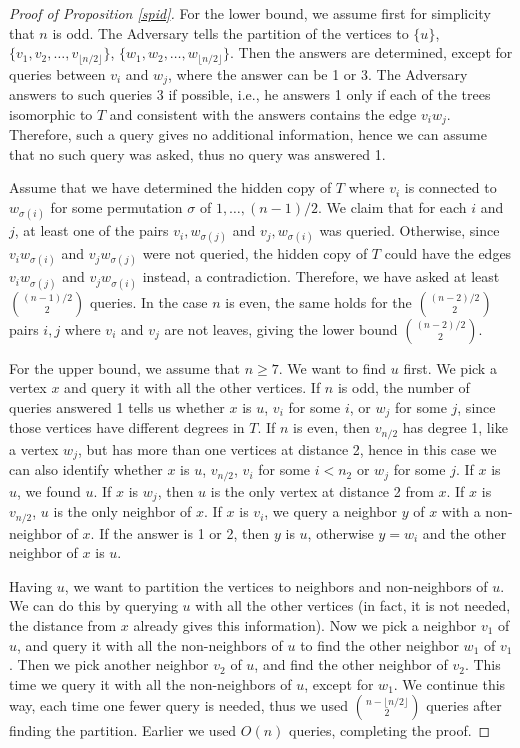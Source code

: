 \documentclass[12pt,a4paper]{amsart}
\theoremstyle{plain}
\theoremstyle{definition}
\begin{document}
\begin{proof}[Proof of Proposition \ref{spid}]
    For the lower bound, we assume first for simplicity that $n$ is odd. The Adversary tells the partition of the vertices to $\{u\}$, $\{v_1 , v_2,  \ldots , v_{\lfloor n/2 \rfloor}\}$, $\{w_1 , w_2, \ldots , w_{\lfloor n/2 \rfloor}\}$. Then the answers are determined, except for queries between $v_i$ and $w_j$, where the answer can be 1 or 3. The Adversary answers to such queries 3 if possible, i.e., he answers 1 only if each of the trees isomorphic to $T$ and consistent with the answers contains the edge $v_iw_j$. Therefore, such a query gives no additional information, hence we can assume that no such query was asked, thus no query was answered 1.


    Assume that we have determined the hidden copy of $T$ where $v_i$ is connected to $w_{\sigma(i)}$ for some permutation $\sigma$ of $1,\dots,(n-1)/2$. We claim that for each $i$ and $j$, at least one of the pairs $v_i,w_{\sigma(j)}$ and $v_j,w_{\sigma(i)}$ was queried. Otherwise, since $v_iw_{\sigma(i)}$ and $v_jw_{\sigma(j)}$ were not queried, the hidden copy of $T$ could have the edges $v_iw_{\sigma(j)}$ and $v_jw_{\sigma(i)}$ instead, a contradiction. Therefore, we have asked at least $\binom{(n-1)/2}{2}$ queries.
    In the case $n$ is even, the same holds for the $\binom{(n-2)/2}{2}$ pairs $i,j$ where $v_i$ and $v_j$ are not leaves, giving the lower bound $\binom{(n-2)/2}{2}$. 

 

 \smallskip
    

    For the upper bound, we assume that $n\ge 7$. We want to find $u$ first. We pick a vertex $x$ and query it with all the other vertices. If $n$ is odd, the number of queries answered 1 tells us whether $x$ is $u$, $v_i$ for some $i$, or $w_j$ for some $j$, since those vertices have different degrees in $T$.
    If $n$ is even, then $v_{n/2}$ has degree 1, like a vertex $w_j$, but has more than one vertices at distance 2, hence in this case we can also identify whether $x$ is $u$, $v_{n/2}$, $v_i$ for some $i<n_2$ or $w_j$ for some $j$. If $x$ is $u$, we found $u$. If $x$ is $w_j$, then $u$ is the only vertex at distance 2 from $x$. If $x$ is $v_{n/2}$, $u$ is the only neighbor of $x$. If $x$ is $v_i$, we query a neighbor $y$ of $x$ with a non-neighbor of $x$. If the answer is 1 or 2, then $y$ is $u$, otherwise $y=w_i$ and the other neighbor of $x$ is $u$.

    Having $u$, we want to partition the vertices to neighbors and non-neighbors of $u$. We can do this by querying $u$ with all the other vertices (in fact, it is not needed, the distance from $x$ already gives this information). Now we pick a neighbor $v_1$ of $u$, and query it with all the non-neighbors of $u$ to find the other neighbor $w_1$ of $v_1$. 
    Then we pick another neighbor $v_2$ of $u$, and find the other neighbor of $v_2$. This time we query it with all the non-neighbors of $u$, except for $w_1$. We continue this way, each time one fewer query is needed, thus we used $\binom{n-\lfloor n/2\rfloor}{2}$ queries after finding the partition. Earlier we used $O(n)$ queries, completing the proof.
\end{proof}
\end{document}
